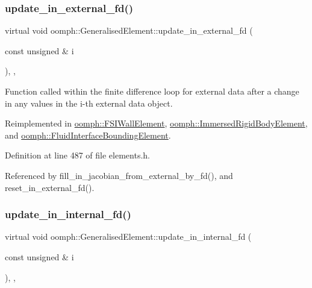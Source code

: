 \subsubsection{\texorpdfstring{update\+\_\+in\+\_\+external\+\_\+fd()}{update\_in\_external\_fd()}}
{\footnotesize\ttfamily virtual void oomph\+::\+Generalised\+Element\+::update\+\_\+in\+\_\+external\+\_\+fd (\begin{DoxyParamCaption}\item[{const unsigned \&}]{i }\end{DoxyParamCaption})\hspace{0.3cm}{\ttfamily [inline]}, {\ttfamily [protected]}, {\ttfamily [virtual]}}



Function called within the finite difference loop for external data after a change in any values in the i-\/th external data object. 



Reimplemented in \hyperlink{classoomph_1_1FSIWallElement_a8274e2b48101edd84f33b6368bc1c90d}{oomph\+::\+F\+S\+I\+Wall\+Element}, \hyperlink{classoomph_1_1ImmersedRigidBodyElement_a54a7da8fcacfc00c29c36561170ad3c6}{oomph\+::\+Immersed\+Rigid\+Body\+Element}, and \hyperlink{classoomph_1_1FluidInterfaceBoundingElement_ab2639a1585fe815bed2d2a3d69fa5164}{oomph\+::\+Fluid\+Interface\+Bounding\+Element}.



Definition at line 487 of file elements.\+h.



Referenced by fill\+\_\+in\+\_\+jacobian\+\_\+from\+\_\+external\+\_\+by\+\_\+fd(), and reset\+\_\+in\+\_\+external\+\_\+fd().

\mbox{\label{classoomph_1_1GeneralisedElement_a0c94ccb2cad3bcf15f97a6e5a6dff90b}} 
\subsubsection{\texorpdfstring{update\+\_\+in\+\_\+internal\+\_\+fd()}{update\_in\_internal\_fd()}}
{\footnotesize\ttfamily virtual void oomph\+::\+Generalised\+Element\+::update\+\_\+in\+\_\+internal\+\_\+fd (\begin{DoxyParamCaption}\item[{const unsigned \&}]{i }\end{DoxyParamCaption})\hspace{0.3cm}{\ttfamily [inline]}, {\ttfamily [protected]}, {\ttfamily [virtual]}}



